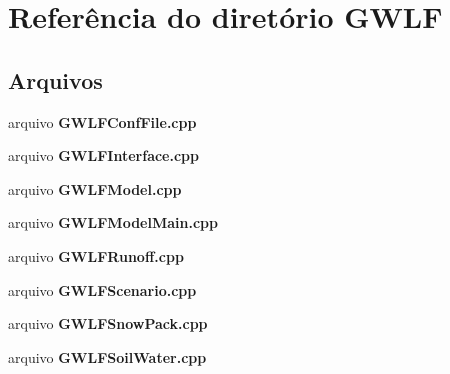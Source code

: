 \section{Referência do diretório G\+W\+LF}
\label{dir_32bc60e7cb0f31278c739b03c62c4e89}
\subsection*{Arquivos}
\begin{DoxyCompactItemize}
\item 
arquivo {\bf G\+W\+L\+F\+Conf\+File.\+cpp}
\item 
arquivo {\bf G\+W\+L\+F\+Interface.\+cpp}
\item 
arquivo {\bf G\+W\+L\+F\+Model.\+cpp}
\item 
arquivo {\bf G\+W\+L\+F\+Model\+Main.\+cpp}
\item 
arquivo {\bf G\+W\+L\+F\+Runoff.\+cpp}
\item 
arquivo {\bf G\+W\+L\+F\+Scenario.\+cpp}
\item 
arquivo {\bf G\+W\+L\+F\+Snow\+Pack.\+cpp}
\item 
arquivo {\bf G\+W\+L\+F\+Soil\+Water.\+cpp}
\end{DoxyCompactItemize}
